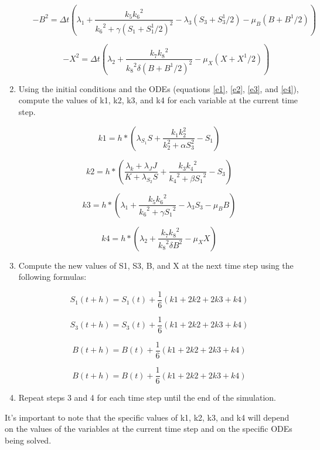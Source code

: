 \begin{enumerate}
\begin{itemize}
\begin{equation}
    -B^2 = \Delta t \left( \lambda_1+ \frac{k_5{k_6}^2}{{k_6}^2+\gamma(S_1+S_1^1/2)^2} - \lambda_3 (S_3+S_3^1/2) - \mu_B (B+B^1/2)\right)
\end{equation}

\begin{equation}
    -X^2 = \Delta t \left( \lambda_2+ \frac{k_7{k_8}^2}{{k_8}^2\delta (B+B^1/2)^2} -\mu_X (X+X^1/2)\right)
\end{equation}

    \end{itemize}

\item Using the initial conditions and the ODEs (equations \eqref{e1}, \eqref{e2}, \eqref{e3}, and \eqref{e4}), compute the values of k1, k2, k3, and k4 for each variable at the current time step.

\begin{equation}
    k1 = h * (\lambda_{S_1} S + \frac{ k_1k_2^2} {k_2^2+\alpha S_3^2} - S_1)
\end{equation}

\begin{equation}
    k2 = h * (\frac{\lambda_k+\lambda_JJ} {K+ \lambda_{S_2} S} +\frac{k_3{k_4}^2}{{k_4}^2+\beta{S_1}^2}-S_3)
\end{equation}

\begin{equation}
    k3 = h * (\lambda_1+ \frac{k_5{k_6}^2}{{k_6}^2+\gamma{S_1}^2} - \lambda_3 S_3 - \mu_BB)
\end{equation}

\begin{equation}
    k4 = h * (\lambda_2+ \frac{k_7{k_8}^2}{{k_8}^2\delta B^2} -\mu_XX)
\end{equation}

\item Compute the new values of S1, S3, B, and X at the next time step using the following formulas:

\begin{equation}
    S_1(t+h) = S_1(t) + \frac{1}{6}(k1 + 2k2 + 2k3 + k4)
\end{equation}

\begin{equation}
    S_3(t+h) = S_3(t) + \frac{1}{6}(k1 + 2k2 + 2k3 + k4)
\end{equation}

\begin{equation}
    B(t+h) = B(t) + \frac{1}{6}(k1 + 2k2 + 2k3 + k4)
\end{equation}

\begin{equation}
    B(t+h) = B(t) + \frac{1}{6}(k1 + 2k2 + 2k3 + k4)
\end{equation}

\item Repeat steps 3 and 4 for each time step until the end of the simulation. 
\end{enumerate}

It's important to note that the specific values of k1, k2, k3, and k4 will depend on the values of the variables at the current time step and on the specific ODEs being solved.

